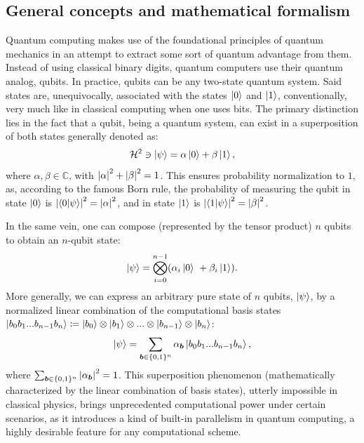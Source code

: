 \subsection*{General concepts and mathematical formalism}

Quantum computing makes use of the foundational principles of quantum mechanics in an attempt to extract some sort of quantum advantage from them. Instead of using classical binary digits, quantum computers use their quantum analog, qubits. In practice, qubits can be any two-state quantum system. Said states are, unequivocally, associated with the states $\ket{0}$ and $\ket{1}$, conventionally, very much like in classical computing when one uses bits. The primary distinction lies in the fact that a qubit, being a quantum system, can exist in a superposition of both states generally denoted as:
\begin{equation}
  \mathcal{H}^2 \ni \ket{\psi} = \alpha \ket{0} + \beta \ket{1},
\end{equation}
where $\alpha, \beta \in \mathbb{C}$, with $\abs{\alpha}^2 + \abs{\beta}^2 = 1$. This ensures probability normalization to $1$, as, according to the famous Born rule, the probability of measuring the qubit in state $\ket{0}$ is $\abs{\bra{0}\ket{\psi}}^2 = \abs{\alpha}^2$, and in state $\ket{1}$ is $\abs{\bra{1}\ket{\psi}}^2 = \abs{\beta}^2$.

In the same vein, one can compose (represented by the tensor product) $n$ qubits to obtain an $n$-qubit state:
\begin{equation}\label{eq:n_qubit_state}
  \ket{\psi}=\bigotimes_{i=0}^{n-1}(\alpha_{i}\ket{0}\ +\beta_{i}\ket{1}).
\end{equation}
More generally, we can express an arbitrary pure state of $n$ qubits, $\ket{\psi}$, by a normalized linear combination of the computational basis states $\ket{b_0 b_1 ... b_{n-1} b_n} \coloneq \ket{b_0} \otimes \ket{b_1} \otimes ... \otimes \ket{b_{n-1}} \otimes \ket{b_n}$:
\begin{equation}\label{eq:general_n_qubit_state}
  \ket{\psi} = \sum_{\boldsymbol{b} \in \{0, 1\}^{n}} \alpha_{\boldsymbol{b}} \ket{b_0 b_1 ... b_{n-1} b_n},
\end{equation}
where $\sum_{\boldsymbol{b} \in \{0, 1\}^{n}} \abs{\alpha_{\boldsymbol{b}}}^2 = 1$. This superposition phenomenon (mathematically characterized by the linear combination of basis states), utterly impossible in classical physics, brings unprecedented computational power under certain scenarios, as it introduces a kind of built-in parallelism in quantum computing, a highly desirable feature for any computational scheme.

